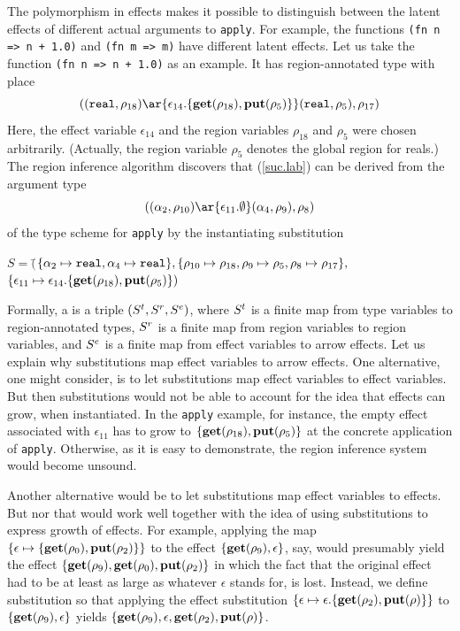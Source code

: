 \documentclass[12pt]{book}
\begin{document}
The polymorphism in effects makes it possible to distinguish between
the latent effects of different actual arguments to {\tt apply}. For
example, the functions {\tt (fn n => n + 1.0)} and {\tt (fn m => m)}
have different latent effects. Let us take the function {\tt (fn n =>
  n + 1.0)} as an example. It has region-annotated type with place
\begin{equation}
\label{suc.lab}
((\boxml{real},\rho_{18})\ar{\epsilon_{14}.\{\Get(\rho_{18}),\Put(\rho_5)\}}(\boxml{real}, \rho_5), \rho_{17})
\end{equation}
Here, the effect variable $\epsilon_{14}$ and the region variables
$\rho_{18}$ and $\rho_5$ were chosen arbitrarily. (Actually, the region
variable $\rho_5$ denotes the global region for reals.) The region
inference algorithm discovers that (\ref{suc.lab}) can be derived from the argument type
$$((\alpha_2,\rho_{10})\ar{\epsilon_{11}.\emptyset}(\alpha_4,\rho_9),\rho_8)$$
of the type
scheme for {\tt apply} by the instantiating substitution
\begin{tabbing}
$S =($\=$\{\alpha_2\mapsto\hbox{\tt real},\alpha_4\mapsto\hbox{\tt real}\},\{
       \rho_{10}\mapsto\rho_{18},\rho_9\mapsto\rho_5,\rho_8\mapsto\rho_{17}\},$\\
\>$\{
       \epsilon_{11}\mapsto\epsilon_{14}.\{\mathop{\bf get}\nolimits(\rho_{18}),\mathop{\bf put}\nolimits(\rho_5)\})$
\end{tabbing}
Formally, a  is a triple
$(S^t,S^r,S^e)$, where $S^t$ is a finite map from type variables to
region-annotated types, $S^r$ is a finite map from region variables to
region variables, and $S^e$ is a finite map from effect variables to
arrow effects.  Let us explain why substitutions map
effect variables to arrow effects.  One alternative, one might
consider, is to let substitutions map effect variables to effect
variables. But then substitutions would not be able to account for the
idea that effects can grow, when instantiated. In the {\tt apply}
example, for instance, the empty effect associated with $\epsilon_{11}$
has to grow to $\{\mathop{\bf get}\nolimits(\rho_{18}),\mathop{\bf put}\nolimits(\rho_5)\}$ at the concrete
application of {\tt apply}. Otherwise, as it is easy to demonstrate,
the region inference system would become unsound.

Another alternative would be to let substitutions
map effect variables to effects. But nor that would work well together with the idea of
using substitutions to express growth of effects. For example, applying the
map $\{\epsilon\mapsto\{\mathop{\bf get}\nolimits(\rho_0),\mathop{\bf put}\nolimits(\rho_2)\}\}$ to the effect $\{\mathop{\bf get}\nolimits(\rho_9),\epsilon\}$,
say, 
would presumably yield the effect $\{\mathop{\bf get}\nolimits(\rho_9),\mathop{\bf get}\nolimits(\rho_0),\mathop{\bf put}\nolimits(\rho_2)\}$ in which the fact
that the original effect had to be at least as large as whatever $\epsilon$ stands for, is lost.
Instead, we define substitution so that applying the effect substitution
$\{\epsilon\mapsto\epsilon.\{\mathop{\bf get}\nolimits(\rho_2),\mathop{\bf put}\nolimits(\rho)\}\}$ to 
$\{\mathop{\bf get}\nolimits(\rho_9),\epsilon\}$ yields $\{\mathop{\bf get}\nolimits(\rho_9),\epsilon,\mathop{\bf get}\nolimits(\rho_2),\mathop{\bf put}\nolimits(\rho)\}$.
\end{document}
